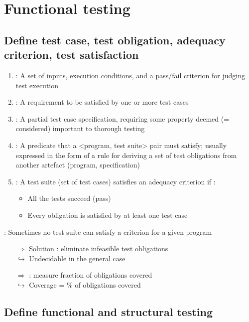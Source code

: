 \chapter{Functional testing}

\section{Define test case, test obligation, adequacy criterion, test satisfaction}

\begin{enumerate}
    \item {} : A set of inputs, execution conditions, and a pass/fail criterion for judging test execution
    \item {} : A requirement to be satisfied by one or more test cases
    \item {} : A partial test case specification, requiring some property deemed (= considered) important to thorough testing
    \item {}: A predicate that a <program, test suite> pair must satisfy; usually expressed in the form of a rule for deriving a set of test obligations from another artefact (program, specification)
    \item {}:
    A test suite (set of test cases) satisfies an adequacy criterion if :
    \begin{itemize}
        \item All the tests succeed (pass)
        \item Every obligation is satisfied by at least one test case
    \end{itemize}
\end{enumerate}

: Sometimes no test suite can satisfy a criterion for a given program
\begin{itemize}
    \item [$\Rightarrow$] Solution : eliminate infeasible test obligations\\
    $\hookrightarrow$ Undecidable in the general case
    \item [$\Rightarrow$] : measure fraction of obligations covered\\
    $\hookrightarrow$ Coverage = \% of obligations covered
\end{itemize}

\section{Define functional and structural testing}

